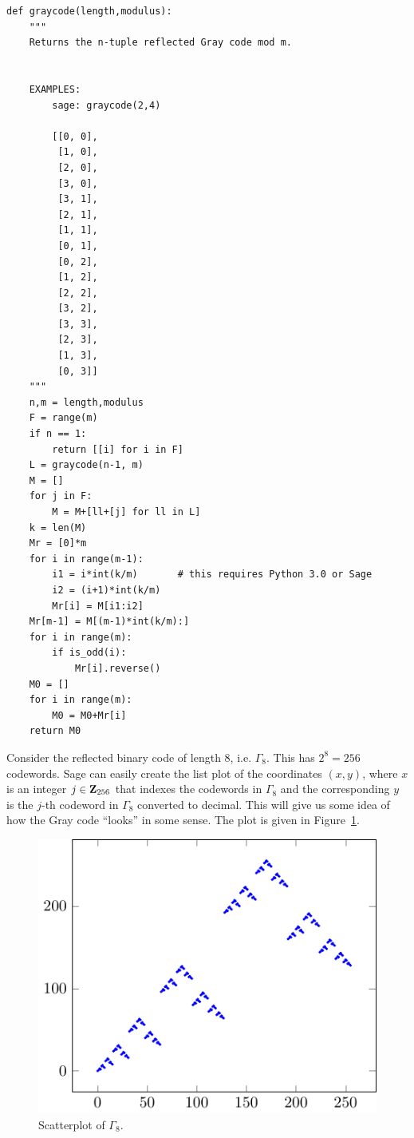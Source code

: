 \begin{lstlisting}
def graycode(length,modulus):
    """
    Returns the n-tuple reflected Gray code mod m.


    EXAMPLES:
        sage: graycode(2,4)

        [[0, 0],
         [1, 0],
         [2, 0],
         [3, 0],
         [3, 1],
         [2, 1],
         [1, 1],
         [0, 1],
         [0, 2],
         [1, 2],
         [2, 2],
         [3, 2],
         [3, 3],
         [2, 3],
         [1, 3],
         [0, 3]]
    """
    n,m = length,modulus
    F = range(m)
    if n == 1:
        return [[i] for i in F]
    L = graycode(n-1, m)
    M = []
    for j in F:
        M = M+[ll+[j] for ll in L]
    k = len(M)
    Mr = [0]*m
    for i in range(m-1):
        i1 = i*int(k/m)       # this requires Python 3.0 or Sage
        i2 = (i+1)*int(k/m)
        Mr[i] = M[i1:i2]
    Mr[m-1] = M[(m-1)*int(k/m):]
    for i in range(m):
        if is_odd(i):
            Mr[i].reverse()
    M0 = []
    for i in range(m):
        M0 = M0+Mr[i]
    return M0
\end{lstlisting}

\vskip 0.2in
Consider the reflected binary code of
length $8$, i.e. $\Gamma_8$. This has $2^8 = 256$ codewords. Sage can
easily create the list plot of the coordinates $(x,y)$, where $x$ is
an integer $j \in \mathbf{Z}_{256}$ that indexes the codewords in $\Gamma_8$
and the corresponding $y$ is the $j$-th codeword in $\Gamma_8$
converted to decimal. This will give us some idea of how the Gray code
``looks'' in some sense. The plot is given in
Figure~\ref{fig:trees_forests:Gamma_8}.

\begin{figure}[!htbp]
\centering
{}
\includegraphics{image/trees-forests/gamma8}
\caption{Scatterplot of $\Gamma_8$.}
\label{fig:trees_forests:Gamma_8}
\end{figure}

